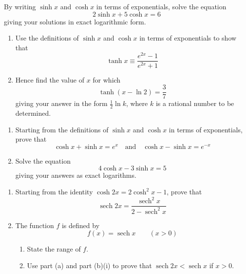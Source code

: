 \documentclass[leqno]{article}
\begin{document}
\djsFrontMatter
\begin{enumerate}[
  label=\textbf{\arabic*.},
  leftmargin=*,
  topsep=0pt,
  partopsep=0pt,
  parsep=0pt
]

\questionitem

By writing $\sinh x$ and $\cosh x$ in terms of exponentials, solve the equation \[2\sinh x+5\cosh x=6\] giving your solutions in exact logarithmic form. 

\newpage

\questionitem

\begin{enumerate}[label=\textbf{(\alph*)}]
  \item Use the definitions of $\sinh x$ and $\cosh x$ in terms of exponentials to show that
  \[
  \tanh x \equiv \frac{e^{2x}-1}{e^{2x}+1}
  \]
  \item Hence find the value of $x$ for which
  \[
  \tanh(x-\ln 2)=\frac{3}{7}
  \]
  giving your answer in the form $\frac{1}{2}\ln k$, where $k$ is a rational number to be determined.  \\
\end{enumerate}

\newpage

\questionitem

\begin{enumerate}[label=\textbf{(\alph*)}]
  \item Starting from the definitions of $\sinh x$ and $\cosh x$ in terms of exponentials, prove that
  \[
  \cosh x + \sinh x = e^x \quad \text{and} \quad \cosh x - \sinh x = e^{-x}
  \]
  \item Solve the equation
  \[
  4\cosh x - 3\sinh x = 5
  \]
  giving your answers as exact logarithms.  \\
\end{enumerate}

\newpage

\questionitem

\begin{enumerate}[label=\textbf{(\alph*)}]
  \item Starting from the identity $\cosh 2x = 2\cosh^2 x - 1$, prove that
  \[
  \operatorname{sech} 2x = \frac{\operatorname{sech}^2 x}{2-\operatorname{sech}^2 x}
  \]
  \item The function $f$ is defined by
  \[
  f(x)=\operatorname{sech} x \qquad (x>0)
  \]
  \begin{enumerate}[label=(\roman*)]
    \item State the range of $f$. 
    \item Use part (a) and part (b)(i) to prove that $\operatorname{sech} 2x<\operatorname{sech} x$ if $x>0$.  \\
  \end{enumerate}
\end{enumerate}


\end{enumerate}
\end{document}
